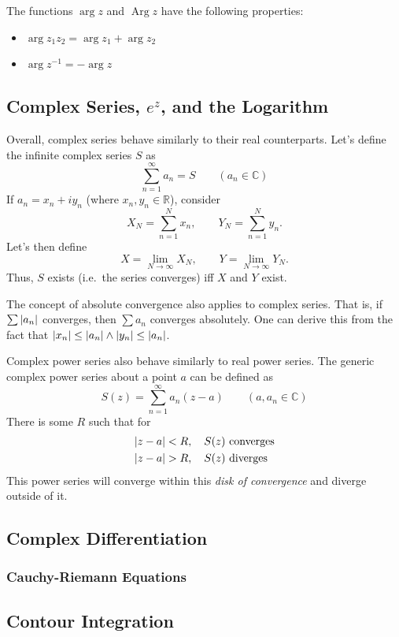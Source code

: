 \documentclass[10pt]{scrartcl}
\numberwithin{equation}{subsection}
\theoremstyle{definition}
\theoremstyle{remark}
\newcommand{\Reals}{\mathbb{R}}
\newcommand{\Complex}{\mathbb{C}}
\newcommand{\inv}[1]{
	{#1}^{-1}
}
\DeclareMathOperator{\Arg}{Arg}
\begin{document}
The functions $\arg{z}$ and $\Arg{z}$ have the following properties:
\begin{itemize}
\item $\arg{z_1 z_2} = \arg{z_1} + \arg{z_2}$
\item $\arg{\inv{z}} = - \arg{z}$
\end{itemize}
\subsection{Complex Series, $e^z$, and the Logarithm}
Overall, complex series behave similarly to their real counterparts.
Let's define the infinite complex series $S$ as 
\begin{equation}
\sum_{n=1}^{\infty} a_n = S \qquad (a_n \in \Complex)
\end{equation}
If $a_n = x_n + i y_n$ (where $x_n, y_n \in \Reals$), consider
\[
X_N = \sum_{n=1}^{N} x_n, \qquad Y_N = \sum_{n=1}^{N} y_n.
\]
Let's then define
\[
X = \lim_{N \to \infty} X_N, \qquad Y = \lim_{N \to \infty} Y_N.
\]
Thus, $S$ exists (i.e.\ the series converges) iff $X$ and $Y$ exist.

The concept of absolute convergence also applies to complex series.
That is, if $\sum \abs{a_n}$ converges, then $ \sum a_n$ converges absolutely. 
One can derive this from the fact that $\abs{x_n} \leq \abs{a_n} \wedge
\abs{y_n} \leq \abs{a_n}$.

Complex power series also behave similarly to real power series. The generic
complex power series about a point $a$ can be defined as
\begin{equation}
S(z) = \sum_{n=1}^{\infty} a_n (z - a) \qquad (a, a_n \in \Complex)
\end{equation}
There is some $R$ such that for
\begin{align*}
\abs{z-a} &< R, \quad S(z) \text{ converges} \\
\abs{z-a} &> R, \quad S(z) \text{ diverges} \\
\end{align*}
This power series will converge within this \textit{disk of convergence} and
diverge outside of it.
\subsection{Complex Differentiation}
\subsubsection{Cauchy-Riemann Equations}
\subsection{Contour Integration}
\end{document}
